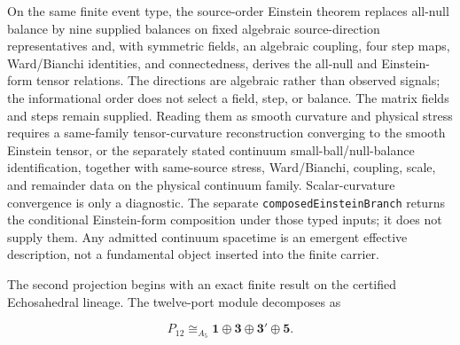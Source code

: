 On the same finite event type, the source-order Einstein theorem replaces
all-null balance by nine supplied balances on fixed algebraic source-direction
representatives and, with symmetric fields, an algebraic coupling, four step
maps, Ward/Bianchi identities, and connectedness, derives the all-null and Einstein-form tensor
relations. The directions are algebraic rather than observed signals; the
informational order does not select a field, step, or balance. The matrix
fields and steps remain supplied. Reading them as smooth curvature and
physical stress requires a same-family tensor-curvature reconstruction
converging to the smooth Einstein tensor, or the separately stated continuum
small-ball/null-balance identification, together with same-source stress,
Ward/Bianchi, coupling, scale, and remainder data on the physical continuum
family. Scalar-curvature convergence is only a diagnostic. The separate
\texttt{composedEinsteinBranch} returns the conditional
Einstein-form composition under those typed inputs; it does not supply them.
Any admitted continuum spacetime is an emergent effective description, not a
fundamental object inserted into the finite carrier.

The second projection begins with an exact finite result on the certified
Echosahedral lineage. The twelve-port module decomposes as

\[
P_{12}\cong_{A_5}\mathbf1\oplus\mathbf3\oplus\mathbf3'\oplus\mathbf5.
\]

